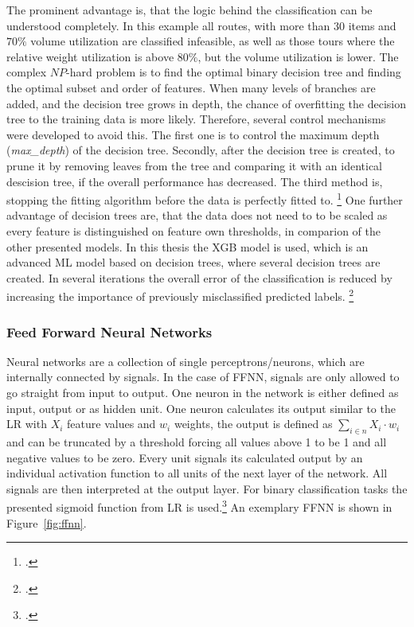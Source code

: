 
The  prominent advantage is, that the logic behind the classification can be understood
completely. In this example all routes, with more than 30 items and $70\%$ volume utilization are classified infeasible,
as well as those tours where the relative weight utilization is above $80\%$, but the volume utilization is lower. The complex
$NP$-hard problem is to find the optimal binary decision tree and finding the optimal subset and order of
features.
When many levels of branches are added, and the decision tree grows in depth, the chance of
overfitting the decision tree to the training data is more likely. Therefore, several control mechanisms
were developed to avoid this. The first one is to control the maximum depth (\textit{max\_depth})
of the decision tree. Secondly, after the decision tree is created, to prune it by removing leaves from
the tree and comparing it with an identical descision tree, if the overall performance has decreased.
The third method is, stopping the fitting algorithm before the data is perfectly fitted to. \footcite[cf.][p. 252]{kotsiantis_supervised_2007}
One further advantage of decision trees are, that the data does not need to to be scaled as every feature is
distinguished on feature own thresholds, in comparion of the other presented models. In this thesis the \gls{XGB} model is used,
which is an advanced \gls{ML} model based on decision trees, where several decision trees are created. In several iterations
the overall error of the classification is reduced by increasing the importance of previously misclassified predicted labels. \footcite[cf.][]{noauthor_introduction_2025}

\subsubsection{Feed Forward Neural Networks}

Neural networks are a collection of single perceptrons/neurons, which are internally connected by
signals. In the case of \gls{FFNN}, signals are only allowed to go straight from input to output. One neuron
in the network is either defined as input, output or as hidden unit. One neuron calculates its
output similar to the \gls{LR} with $X_i$ feature values and $w_i$ weights, the output is defined
as $\sum_{i \in n} X_i \cdot w_i$ and can be truncated by a threshold forcing all values above 1
to be 1 and all negative values to be zero. Every unit signals its calculated output by an individual
activation function to all units of the next layer of the network. All signals are
then interpreted at the output layer. For binary classification tasks the presented sigmoid function from \gls{LR} is used.\footcite[cf.][p. 255]{kotsiantis_supervised_2007}
An exemplary \gls{FFNN} is shown in Figure~\ref{fig:ffnn}.

